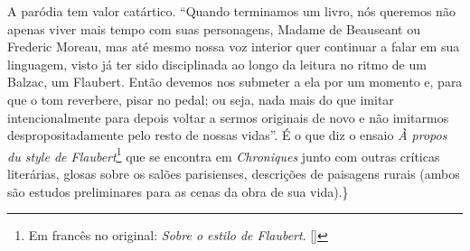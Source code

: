 A paródia tem valor catártico. ``Quando terminamos um livro, nós queremos
não apenas viver mais tempo com suas personagens, Madame de Beauseant ou
Frederic Moreau, mas até mesmo nossa voz interior quer continuar a falar
em sua linguagem, visto já ter sido disciplinada ao longo da leitura no
ritmo de um Balzac, um Flaubert. Então devemos nos submeter a ela por um
momento e, para que o tom reverbere, pisar no pedal; ou
seja, nada mais do que imitar intencionalmente para depois voltar a
sermos originais de novo e não imitarmos despropositadamente pelo resto
de nossas vidas''. É o que diz o ensaio \emph{À propos du style de Flaubert}\footnote{Em francês no original: \emph{Sobre o estilo de Flaubert}. []} que se encontra em \emph{Chroniques} junto com outras críticas literárias, glosas sobre os
salões parisienses, descrições de paisagens rurais (ambos são estudos
preliminares para as cenas da obra de sua vida).\}

